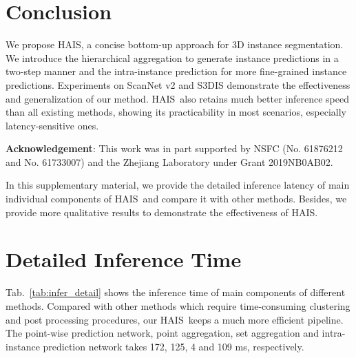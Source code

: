 \documentclass[10pt,twocolumn,letterpaper]{article}
\newcommand{\thename}{HAIS}
\begin{document}
\section{Conclusion}
We propose \thename, a concise bottom-up approach for 3D instance segmentation.
We introduce the hierarchical aggregation to generate instance predictions in a two-step manner and the intra-instance prediction for more fine-grained instance predictions.
Experiments on ScanNet v2 and S3DIS demonstrate the effectiveness and generalization of our method. \thename\ also retains much better inference speed than all existing methods, showing its practicability in most scenarios, especially latency-sensitive ones.

\noindent \textbf{Acknowledgement}: This work was in part supported by NSFC (No. 61876212 and No. 61733007) and the Zhejiang Laboratory under Grant 2019NB0AB02.

{\small


}





\appendix


In this supplementary material, we provide the detailed inference latency of main individual components of \thename\ and compare it with other methods. Besides, we provide more qualitative results to demonstrate the effectiveness of \thename.


\section{Detailed Inference Time}
Tab.~\ref{tab:infer_detail} shows the inference time of main components of different methods. Compared with other methods which require time-consuming clustering and post processing procedures,
our \thename\ keeps a much more efficient pipeline. The point-wise prediction network, point aggregation, set aggregation and intra-instance prediction network takes 172, 125, 4 and 109 ms, respectively.
\end{document}
